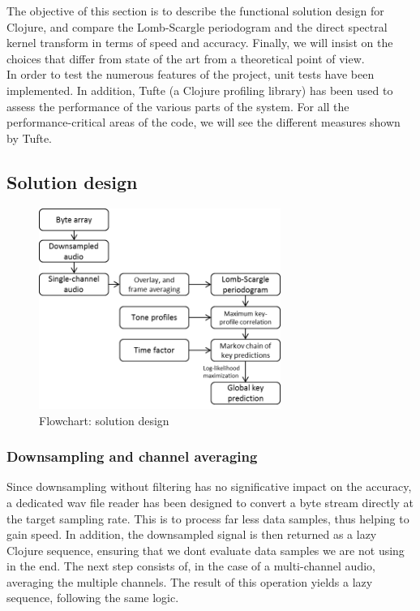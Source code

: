 \documentclass[letterpaper]{article}
\begin{document}
The objective of this section is to describe the functional solution design for Clojure, and compare the Lomb-Scargle periodogram and the direct spectral kernel
transform in terms of speed and accuracy. Finally, we will insist on the choices that differ from state of the art from a theoretical point of view.\\

In order to test the numerous features of the project, unit tests have been implemented. In addition, Tufte (a Clojure profiling library) has been used to assess the performance of the various parts of the system. For all the performance-critical areas of the code, we will see the different measures shown by Tufte.\\

\subsection{Solution design}

\begin{figure}[h!]
\begin{center}
\includegraphics[width=3.1in,angle=0]{imgs/flowChart.png}
\caption{Flowchart: solution design}
\label{fig3}
\end{center}
\end{figure}

\subsubsection{Downsampling and channel averaging}

Since downsampling without filtering has no significative impact on the accuracy, a dedicated wav file reader has been designed to convert a byte stream directly
at the target sampling rate. This is to process far less data samples, thus helping to gain speed. In addition, the downsampled signal is then returned as
a lazy Clojure sequence, ensuring that we don\textquotesingle t evaluate data samples we are not using in the end.
The next step consists of, in the case of a multi-channel audio, averaging the multiple channels. The result of this operation yields a lazy sequence, following
the same logic.
\end{document}
